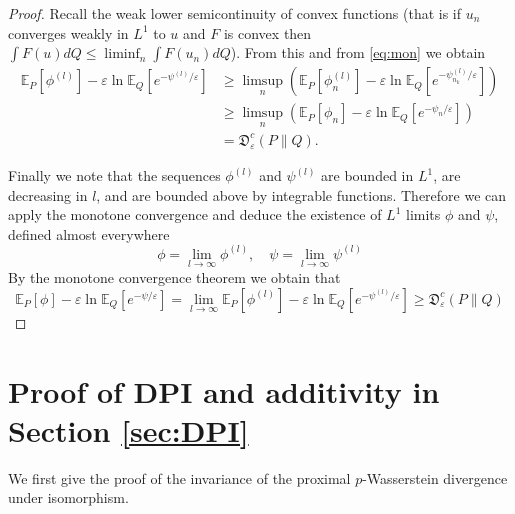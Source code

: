 \documentclass{amsart}
\theoremstyle{definition}
\theoremstyle{remark}
\numberwithin{equation}{section}
\begin{document}
\begin{proof}
Recall the weak lower semicontinuity of convex functions  \cite{brezis1999analyse} (that is if $u_n$ converges weakly in $L^1$ to $u$ and $F$ is convex then $\int F(u) dQ \le \liminf_{n} \int F(u_n) dQ$). 
From this and from \eqref{eq:mon} we obtain
\begin{equation}
\begin{aligned}
\mathbb{E}_P[\phi^{(l)}] - \varepsilon \ln \mathbb{E}_Q[e^{-\psi^{(l)}/\varepsilon}] 
& \ge  \limsup_{n}\left( \mathbb{E}_P[\phi_{n}^{(l)}] - \varepsilon \ln \mathbb{E}_Q[e^{-\psi_{n_k}^{(l)}/\varepsilon}] \right) \\
& \ge  \limsup_{n}\left( \mathbb{E}_P[\phi_{n}] - \varepsilon \ln \mathbb{E}_Q[e^{-\psi_{n}/\varepsilon}] \right) \\
& = \mathfrak{D}^c_\varepsilon(P\|Q).
\end{aligned}
\end{equation}

Finally we note that the sequences $\phi^{(l)}$ and $\psi^{(l)}$ are bounded in $L^1$, are decreasing in $l$, and are bounded above by integrable functions. Therefore we can apply the monotone convergence 
and deduce the existence of  $L^1$ limits $\phi$ and $\psi$, defined almost everywhere 
\begin{equation}
\phi=\lim_{l\to \infty} \phi^{(l)}, \quad \psi=\lim_{l \to \infty} \psi^{(l)}
\end{equation}
By the monotone convergence theorem we obtain that 
\begin{equation}
\mathbb{E}_P[\phi] -\varepsilon \ln \mathbb{E}_Q[e^{-\psi/\varepsilon}] = \lim_{l \to \infty} \mathbb{E}_P[\phi^{(l)}] - \varepsilon \ln \mathbb{E}_Q[e^{-\psi^{(l)}/\varepsilon}] \ge 
\mathfrak{D}^c_\varepsilon(P \|Q)
\end{equation}
\end{proof}

\section{Proof of DPI and additivity in Section \ref{sec:DPI} }
\label{sec:proofs:DPI}

We first give the proof of the invariance of the proximal $p$-Wasserstein divergence under isomorphism.
\end{document}
